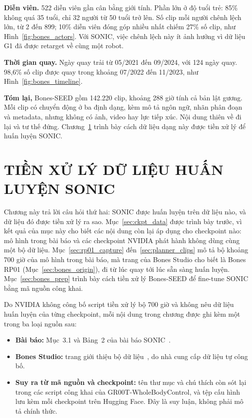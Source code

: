 \documentclass[12pt,a4paper,oneside]{report}
\begin{document}
\textbf{Diễn viên.} 522 diễn viên gần cân bằng giới tính. Phần lớn ở độ tuổi trẻ: 85\% không quá 35 tuổi, chỉ 32 người từ 50 tuổi trở lên. Số clip mỗi người chênh lệch lớn, từ 2 đến 899; 10\% diễn viên đóng góp nhiều nhất chiếm 27\% số clip, như Hình~\ref{fig:bones_actors}. Với SONIC, việc chênh lệch này ít ảnh hưởng vì dữ liệu G1 đã được retarget về cùng một robot.

\textbf{Thời gian quay.} Ngày quay trải từ 05/2021 đến 09/2024, với 124 ngày quay. 98,6\% số clip được quay trong khoảng 07/2022 đến 11/2023, như Hình~\ref{fig:bones_timeline}.

\textbf{Tóm lại,} Bones-SEED gồm 142.220 clip, khoảng 288 giờ tính cả bản lật gương. Mỗi clip có chuyển động ở ba định dạng, kèm mô tả ngôn ngữ, nhãn phân đoạn và metadata, nhưng không có ảnh, video hay lực tiếp xúc. Nội dung thiên về đi lại và tư thế đứng. Chương~\ref{chap:prep} trình bày cách dữ liệu dạng này được tiền xử lý để huấn luyện SONIC.

\chapter{TIỀN XỬ LÝ DỮ LIỆU HUẤN LUYỆN SONIC}
\label{chap:prep}
Chương này trả lời câu hỏi thứ hai: SONIC được huấn luyện trên dữ liệu nào, và dữ liệu đó được tiền xử lý ra sao. Mục~\ref{sec:ckpt_data} được trình bày trước, vì kết quả của mục này cho biết các nội dung còn lại áp dụng cho checkpoint nào: mô hình trong bài báo và các checkpoint NVIDIA phát hành không dùng cùng một bộ dữ liệu. Mục~\ref{sec:rp01_capture} đến~\ref{sec:planner_clips} mô tả bộ khoảng 700 giờ của mô hình trong bài báo, mà trang của Bones Studio cho biết là Bones RP01 (Mục~\ref{sec:bones_origin}), đi từ lúc quay tới lúc sẵn sàng huấn luyện. Mục~\ref{sec:bones_prep} trình bày cách tiền xử lý Bones-SEED để fine-tune SONIC bằng mã nguồn công khai.

Do NVIDIA không công bố script tiền xử lý bộ 700 giờ và không nêu dữ liệu huấn luyện của từng checkpoint, mỗi nội dung trong chương được ghi kèm một trong ba loại nguồn sau:
\begin{itemize}
\item \textbf{Bài báo:} Mục~3.1 và Bảng~2 của bài báo SONIC~\cite{sonic}.
\item \textbf{Bones Studio:} trang giới thiệu bộ dữ liệu~\cite{bonesweb}, do nhà cung cấp dữ liệu tự công bố.
\item \textbf{Suy ra từ mã nguồn và checkpoint:} tên thư mục và chú thích còn sót lại trong các script công khai của GR00T-WholeBodyControl, và tệp cấu hình lưu kèm mỗi checkpoint trên Hugging Face. Đây là suy luận, không phải mô tả chính thức.
\end{itemize}
\end{document}

